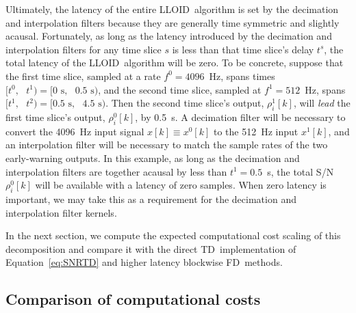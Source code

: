 \documentclass[preprint2]{aastex}
\newcommand{\SNR}{S/N}%
\newcommand{\lloid}{LLOID}%
\newcommand{\TD}{TD}%
\newcommand{\FD}{FD}%
\begin{document}
Ultimately, the latency of the entire \lloid\ algorithm is set by the decimation
and interpolation filters because they are generally time symmetric and slightly
acausal.  Fortunately, as long as the latency introduced by the decimation and interpolation
filters for any time slice $s$ is less than that time slice's delay $t^s$, the
total latency of the \lloid\ algorithm will be zero.  To be concrete, suppose that the first time slice, sampled at a rate $f^0 = 4096$~Hz, spans times $[t^0,\textrm{ }t^1) = [0\textrm{ s},\textrm{ }0.5\textrm{ s})$, and the second time slice, sampled at $f^1 = 512$~Hz, spans $[t^1,\textrm{ }t^2) = [0.5\textrm{ s},\textrm{ }4.5\textrm{ s})$.  Then the second time slice's output, $\rho_i^1[k]$, will \emph{lead} the first time slice's output, $\rho_i^0[k]$, by 0.5~s.  A decimation filter will be necessary to convert the 4096~Hz input signal $x[k] \equiv x^0[k]$ to the 512~Hz input $x^1[k]$, and an interpolation filter will be necessary to match the sample rates of the two early-warning outputs.  In this example, as long as the decimation and interpolation filters are together acausal by less than $t^1 = 0.5$~s, the total \SNR\ $\rho_i^0[k]$ will be available with a latency of zero samples.  When zero latency is important, we may take this as a requirement for the decimation and interpolation filter kernels.

In the next section, we compute the expected computational cost scaling of this
decomposition and compare it with the direct \TD\ implementation of
Equation~\eqref{eq:SNRTD} and higher latency blockwise \FD\ methods.

\subsection{Comparison of computational costs}
\end{document}

